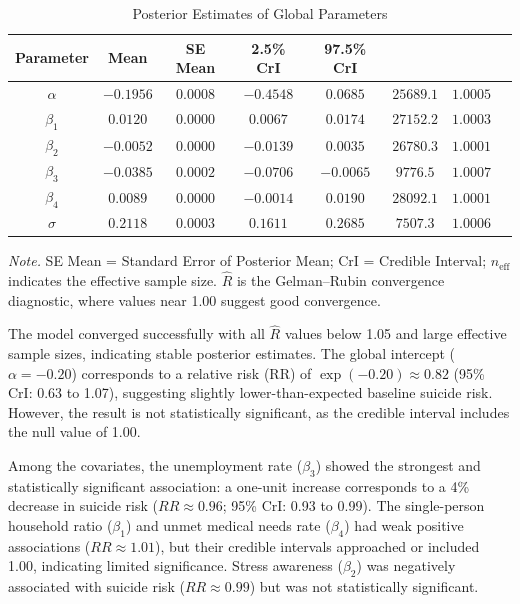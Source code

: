 \documentclass[11pt]{article}
\begin{document}
	\begin{table}[H]
		\centering
		\caption{Posterior Estimates of Global Parameters}
		\renewcommand{\arraystretch}{1.3}
		\begin{tabular}{cccccccc}
			\hline
			\textbf{Parameter} & \textbf{Mean} & \textbf{SE Mean} & \textbf{2.5\% CrI} & \textbf{97.5\% CrI} & \boldmath{$n_\text{eff}$} & \boldmath{$\hat{R}$} \\
			\hline
			$\alpha$   & $-0.1956$ & $0.0008$ & $-0.4548$ & $0.0685$ & $25689.1$ & $1.0005$ \\
			$\beta_1$  & $0.0120$  & $0.0000$ & $0.0067$  & $0.0174$ & $27152.2$ & $1.0003$ \\
			$\beta_2$  & $-0.0052$ & $0.0000$ & $-0.0139$ & $0.0035$ & $26780.3$ & $1.0001$ \\
			$\beta_3$  & $-0.0385$ & $0.0002$ & $-0.0706$ & $-0.0065$ & $9776.5$  & $1.0007$ \\
			$\beta_4$  & $0.0089$  & $0.0000$ & $-0.0014$ & $0.0190$ & $28092.1$ & $1.0001$ \\
			$\sigma$   & $0.2118$  & $0.0003$ & $0.1611$  & $0.2685$ & $7507.3$  & $1.0006$ \\
			\hline
		\end{tabular}
		
		\vspace{0.5em}
		
		\begin{minipage}{0.9\textwidth}
			\vspace{0.5em}
			\footnotesize
			\textit{Note.} SE Mean = Standard Error of Posterior Mean; CrI = Credible Interval; $n_\text{eff}$ indicates the effective sample size. $\hat{R}$ is the Gelman–Rubin convergence diagnostic, where values near 1.00 suggest good convergence.
		\end{minipage}
		\label{tab:icar_results}
	\end{table}
	
	The model converged successfully with all $\hat{R}$ values below 1.05 and large effective sample sizes, indicating stable posterior estimates. The global intercept ($\alpha = -0.20$) corresponds to a relative risk (RR) of $\exp(-0.20) \approx 0.82$ (95\% CrI: 0.63 to 1.07), suggesting slightly lower-than-expected baseline suicide risk. However, the result is not statistically significant, as the credible interval includes the null value of 1.00.
	
	Among the covariates, the unemployment rate ($\beta_3$) showed the strongest and statistically significant association: a one-unit increase corresponds to a 4\% decrease in suicide risk ($RR \approx 0.96$; 95\% CrI: 0.93 to 0.99). The single-person household ratio ($\beta_1$) and unmet medical needs rate ($\beta_4$) had weak positive associations ($RR \approx 1.01$), but their credible intervals approached or included 1.00, indicating limited significance. Stress awareness ($\beta_2$) was negatively associated with suicide risk ($RR \approx 0.99$) but was not statistically significant.
	
\end{document}
